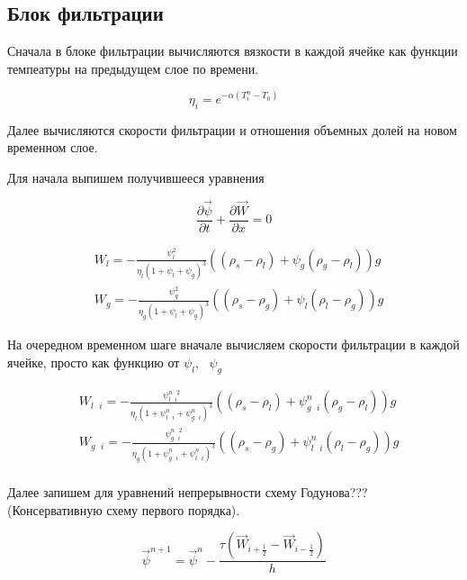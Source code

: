 \documentclass[12pt,a4paper]{article}
\newcommand{\pd}[2]{\frac{\partial #1}{\partial #2}}
\begin{document}
\subsection{Блок фильтрации}

Сначала в блоке фильтрации вычисляются вязкости в каждой ячейке как функции темпеатуры на предыдущем слое по времени.

\begin{equation}
\eta_i = e^{-\alpha(T_i^n - T_0)}
\end{equation}

Далее вычисляются скорости фильтрации и отношения объемных долей на новом временном слое.

Для начала выпишем получившееся уравнения

\begin{equation*}
\frac{\partial \vec\psi}{\partial t}  + \pd {\vec W} {x} = 0
\end{equation*}

\begin{equation*}
\begin{aligned}
&W_l = - \frac{\psi_l^2}{\eta_l(1 + \psi_l + \psi_g)^3}((\rho_s - \rho_l) + \psi_g(\rho_g - \rho_l))g\\	
&W_g = - \frac{\psi_g^2}{\eta_g(1 + \psi_l + \psi_g)^3}((\rho_s - \rho_g) + \psi_l(\rho_l - \rho_g))g
\end{aligned}
\end{equation*}

На очередном временном шаге вначале вычисляем скорости фильтрации в каждой ячейке, просто как функцию от $\psi_l , \text{ } \psi_g$

\begin{equation*}
\begin{aligned}
&W_{l \text{ } i} = - \frac{\psi_{l \text{ } i}^{n\text{ } 2}  }{\eta_l(1 + \psi_{l \text{ } i}^n + \psi_{g \text{ } i}^n)^3}((\rho_s - \rho_l) + \psi_{g \text{ } i}^n(\rho_g - \rho_l))g\\	
&W_{g \text{ } i} = - \frac{\psi_{g \text{ } i}^{n\text{ } 2}  }{\eta_g(1 + \psi_{g \text{ } i}^n + \psi_{l \text{ } i}^n)^3}((\rho_s - \rho_g) + \psi_{l \text{ } i}^n(\rho_l - \rho_g))g\\	
\end{aligned}
\end{equation*}

Далее запишем для уравнений непрерывности схему Годунова???(Консервативную схему первого порядка).

\begin{equation}
\vec \psi^{n+1} = \vec \psi^n - \frac {\tau(\vec W_{i+\frac12} - \vec W_{i-\frac12})}{h}
\end{equation}
\end{document}
